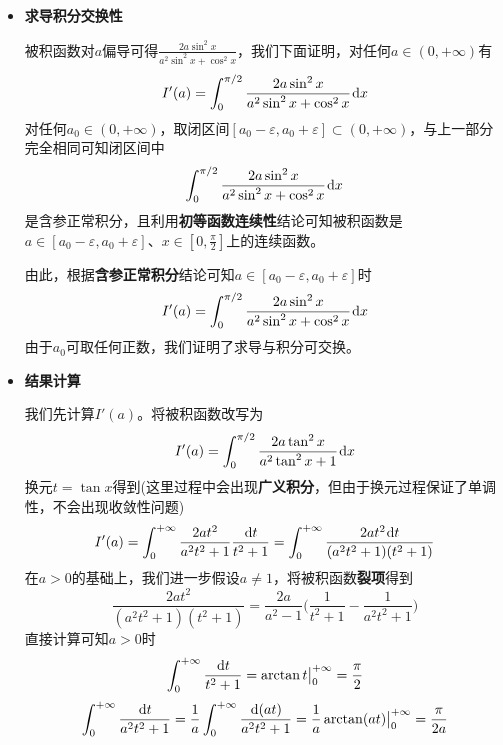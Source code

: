 \documentclass[a4paper,UTF8,fontset=windows,AutoFakeBold]{ctexart}
\newcommand*{\dr}{\hspace{0.07em}\mathrm{d}}
\newcommand*{\rb}{\mathbb{R}}
\newcommand*{\note}{\noindent *}
\theoremstyle{ex}
\begin{document}
\begin{framed}
{\begin{itemize}
        \note 教材11.2节的定理只给出了$a$、$x$都在闭区间中的情况，对任何$a_0\in(0,+\infty)$，考虑闭区间$[a_0-\varepsilon,a_0+\varepsilon]\subset(0,+\infty)$并应用教材定理即可得到在$a_0$点的连续性。

        为了证明$a=0$处的连续性，考虑闭区间$[-1,1]$。当$a\in[-1,1]$、$x\in[0,\frac{\pi}{2}]$时恒有$a^2\sin^2x+\cos^2x\le1$，从而有
        $$|\ln(a^2\sin^2x+\cos^2x)|\le|\ln\cos^2x|=-\ln\cos^2x$$
        由于第一部分已经证明了
        $$\int_0^{\pi/2}-\ln\cos^2x\dr x$$
        收敛，从而通过\textbf{$M$判别法}可知$I(a)$在$[-1,1]$上\textbf{一致收敛}(这里的一致收敛性为将$\frac{\pi}{2}$视为瑕点的一致收敛，虽然$a\ne0$时其不为瑕积分，但可完全类似定义并具有类似性质)，这就用含参积分一致收敛的性质证明了$I(a)$在$[-1,1]$连续，将它与之前的结果结合可得$I(a)$在$\rb$上连续。

        \item \textbf{求导积分交换性}
        
        被积函数对$a$偏导可得$\frac{2a\sin^2x}{a^2\sin^2x+\cos^2x}$，我们下面证明，对任何$a\in(0,+\infty)$有
        $$I'(a)=\int_0^{\pi/2}\frac{2a\sin^2x}{a^2\sin^2x+\cos^2x}\dr x$$
        对任何$a_0\in(0,+\infty)$，取闭区间$[a_0-\varepsilon,a_0+\varepsilon]\subset(0,+\infty)$，与上一部分完全相同可知闭区间中
        $$\int_0^{\pi/2}\frac{2a\sin^2x}{a^2\sin^2x+\cos^2x}\dr x$$
        是含参正常积分，且利用\textbf{初等函数连续性}结论可知被积函数是$a\in[a_0-\varepsilon,a_0+\varepsilon]$、$x\in[0,\frac{\pi}{2}]$上的连续函数。
        
        由此，根据\textbf{含参正常积分}结论可知$a\in[a_0-\varepsilon,a_0+\varepsilon]$时
        $$I'(a)=\int_0^{\pi/2}\frac{2a\sin^2x}{a^2\sin^2x+\cos^2x}\dr x$$
        由于$a_0$可取任何正数，我们证明了求导与积分可交换。
            
        \item \textbf{结果计算}
            
        我们先计算$I'(a)$。将被积函数改写为
        $$I'(a)=\int_0^{\pi/2}\frac{2a\tan^2x}{a^2\tan^2x+1}\dr x$$
        换元$t=\tan x$得到(这里过程中会出现\textbf{广义积分}，但由于换元过程保证了单调性，不会出现收敛性问题)
        $$I'(a)=\int_0^{+\infty}\frac{2at^2}{a^2t^2+1}\frac{\dr t}{t^2+1}=\int_0^{+\infty}\frac{2at^2\dr t}{(a^2t^2+1)(t^2+1)}$$
        在$a>0$的基础上，我们进一步假设$a\ne1$，将被积函数\textbf{裂项}得到
        $$\frac{2at^2}{(a^2t^2+1)(t^2+1)}=\frac{2a}{a^2-1}\bigg(\frac{1}{t^2+1}-\frac{1}{a^2t^2+1}\bigg)$$
        直接计算可知$a>0$时
        $$\int_0^{+\infty}\frac{\dr t}{t^2+1}=\arctan t\big|^{+\infty}_0=\frac{\pi}{2}$$
        $$\int_0^{+\infty}\frac{\dr t}{a^2t^2+1}=\frac{1}{a}\int_0^{+\infty}\frac{\dr(at)}{a^2t^2+1}=\frac{1}{a}\arctan(at)\big|^{+\infty}_0=\frac{\pi}{2a}$$


\end{itemize}}
\end{framed}
\end{document}
